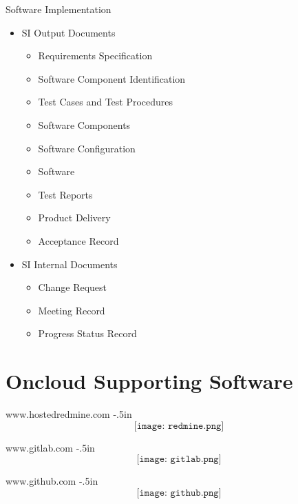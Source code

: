 \begin{frame}{Software Implementation}
\begin{itemize}
\item SI Output Documents
\begin{itemize}
\item Requirements Specification
\item Software Component Identification
\item Test Cases and Test Procedures
\item Software Components
\item Software Configuration
\item Software
\item Test Reports
\item Product Delivery
\item Acceptance Record
\end{itemize}
\item SI Internal Documents
\begin{itemize}
\item Change Request
\item Meeting Record
\item Progress Status Record
\end{itemize}
\end{itemize}
\end{frame}

\section{Oncloud Supporting Software}
\begin{frame}{www.hostedredmine.com}
\null
\kern -.5in
$$\texttt{[image: redmine.png]}$$
\end{frame}

\begin{frame}{www.gitlab.com}
\null
\kern -.5in
$$\texttt{[image: gitlab.png]}$$
\end{frame}

\begin{frame}{www.github.com}
\null
\kern -.5in
$$\texttt{[image: github.png]}$$
\end{frame}
\endinput

